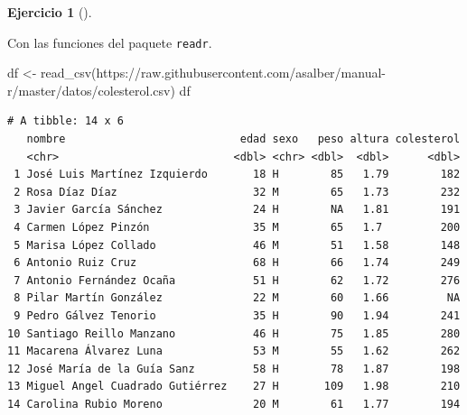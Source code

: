 \documentclass[
  a4paper,
]{scrreport}
\newenvironment{Shaded}{\begin{snugshade}}{\end{snugshade}}
\newcommand{\FunctionTok}[1]{\textcolor[rgb]{0.28,0.35,0.67}{#1}}
\newcommand{\NormalTok}[1]{\textcolor[rgb]{0.00,0.23,0.31}{#1}}
\newcommand{\OtherTok}[1]{\textcolor[rgb]{0.00,0.23,0.31}{#1}}
\newcommand{\StringTok}[1]{\textcolor[rgb]{0.13,0.47,0.30}{#1}}
\theoremstyle{definition}
\newtheorem{exercise}{Ejercicio}[chapter]
\theoremstyle{remark}
\begin{document}
\begin{exercise}[]
\begin{tcolorbox}
\end{tcolorbox}

\begin{tcolorbox}[enhanced jigsaw, title=\textcolor{quarto-callout-tip-color}{\faLightbulb}\hspace{0.5em}{Solución 2}, coltitle=black, opacitybacktitle=0.6, rightrule=.15mm, colback=white, bottomtitle=1mm, breakable, leftrule=.75mm, opacityback=0, colbacktitle=quarto-callout-tip-color!10!white, left=2mm, colframe=quarto-callout-tip-color-frame, toptitle=1mm, titlerule=0mm, arc=.35mm, bottomrule=.15mm, toprule=.15mm]

Con las funciones del paquete \texttt{readr}.

\begin{Shaded}
\begin{Highlighting}[]
\NormalTok{df }\OtherTok{\textless{}{-}} \FunctionTok{read\_csv}\NormalTok{(}\StringTok{\textquotesingle{}https://raw.githubusercontent.com/asalber/manual{-}r/master/datos/colesterol.csv\textquotesingle{}}\NormalTok{)}
\NormalTok{df}
\end{Highlighting}
\end{Shaded}

\begin{verbatim}
# A tibble: 14 x 6
   nombre                           edad sexo   peso altura colesterol
   <chr>                           <dbl> <chr> <dbl>  <dbl>      <dbl>
 1 José Luis Martínez Izquierdo       18 H        85   1.79        182
 2 Rosa Díaz Díaz                     32 M        65   1.73        232
 3 Javier García Sánchez              24 H        NA   1.81        191
 4 Carmen López Pinzón                35 M        65   1.7         200
 5 Marisa López Collado               46 M        51   1.58        148
 6 Antonio Ruiz Cruz                  68 H        66   1.74        249
 7 Antonio Fernández Ocaña            51 H        62   1.72        276
 8 Pilar Martín González              22 M        60   1.66         NA
 9 Pedro Gálvez Tenorio               35 H        90   1.94        241
10 Santiago Reillo Manzano            46 H        75   1.85        280
11 Macarena Álvarez Luna              53 M        55   1.62        262
12 José María de la Guía Sanz         58 H        78   1.87        198
13 Miguel Angel Cuadrado Gutiérrez    27 H       109   1.98        210
14 Carolina Rubio Moreno              20 M        61   1.77        194
\end{verbatim}

\end{tcolorbox}


\end{exercise}
\end{document}
